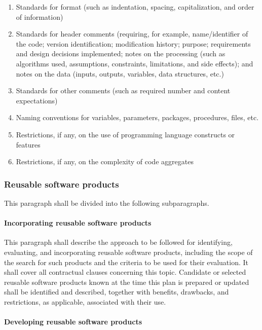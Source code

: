 \documentclass{fidata-report-template}
\begin{document}
\begin{enumerate}
\itemsep1pt\parskip0pt
\item
  Standards for format (such as indentation, spacing, capitalization,
  and order of information)
\item
  Standards for header comments (requiring, for example, name/identifier
  of the code; version identification; modification history; purpose;
  requirements and design decisions implemented; notes on the processing
  (such as algorithms used, assumptions, constraints, limitations, and
  side effects); and notes on the data (inputs, outputs, variables, data
  structures, etc.)
\item
  Standards for other comments (such as required number and content
  expectations)
\item
  Naming conventions for variables, parameters, packages, procedures,
  files, etc.
\item
  Restrictions, if any, on the use of programming language constructs or
  features
\item
  Restrictions, if any, on the complexity of code aggregates
\end{enumerate}

\subsubsection{Reusable software products}

This paragraph shall be divided into the following subparagraphs.

\paragraph{Incorporating reusable software products}

This paragraph shall describe the approach to be followed for
identifying, evaluating, and incorporating reusable software products,
including the scope of the search for such products and the criteria to
be used for their evaluation. It shall cover all contractual clauses
concerning this topic. Candidate or selected reusable software products
known at the time this plan is prepared or updated shall be identified
and described, together with benefits, drawbacks, and restrictions, as
applicable, associated with their use.

\paragraph{Developing reusable software products}
\end{document}
